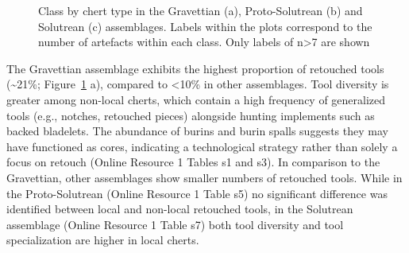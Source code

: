 \documentclass[
  a4paper,
  DIV=11,
  numbers=noendperiod]{scrreprt}
\begin{document}
\begin{figure}


\caption{\label{fig-general-graphs}Class by chert type in the Gravettian
(a), Proto-Solutrean (b) and Solutrean (c) assemblages. Labels within
the plots correspond to the number of artefacts within each class. Only
labels of n\textgreater7 are shown}

\end{figure}%

The Gravettian assemblage exhibits the highest proportion of retouched
tools (\textasciitilde21\%; Figure~\ref{fig-general-graphs} a), compared
to \textless10\% in other assemblages. Tool diversity is greater among
non-local cherts, which contain a high frequency of generalized tools
(e.g., notches, retouched pieces) alongside hunting implements such as
backed bladelets. The abundance of burins and burin spalls suggests they
may have functioned as cores, indicating a technological strategy rather
than solely a focus on retouch (Online Resource 1 Tables s1 and s3). In
comparison to the Gravettian, other assemblages show smaller numbers of
retouched tools. While in the Proto-Solutrean (Online Resource 1 Table
s5) no significant difference was identified between local and non-local
retouched tools, in the Solutrean assemblage (Online Resource 1 Table
s7) both tool diversity and tool specialization are higher in local
cherts.
\end{document}
